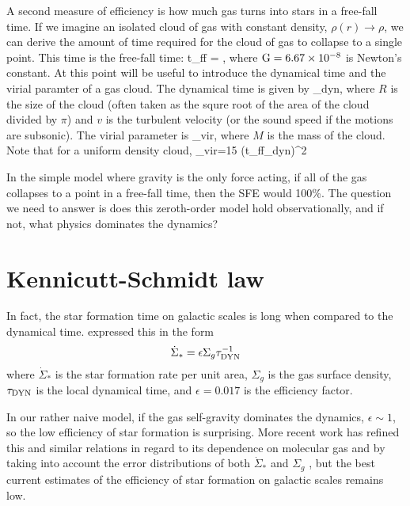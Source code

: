 \documentclass[../dissertation.tex]{subfiles}
\begin{document}
A second measure of efficiency is how much gas turns into stars in a free-fall time. If we imagine an isolated cloud of gas with constant density, $\rho(r) \rightarrow \rho$, we can derive the amount of time required for the cloud of gas to collapse to a single point.
This time is the free-fall time:
%
\be
t_{\rm ff} = ,
\ee
%
where $ {\rm G} = 6.67 \times 10^{-8} $ is Newton's constant. At this point will be useful to introduce the dynamical time and the virial paramter of a gas cloud. The dynamical time is given by
%
\be
\tau_{\rm dyn},
\ee
%
where $R$ is the size of the cloud (often taken as the squre root of the area of the cloud divided by $\pi$) and $v$ is the turbulent velocity (or the sound speed if the motions are subsonic). The virial parameter is
%
\be
\alpha_{\rm vir},
\ee
%
where $M$ is the mass of the cloud. Note that for a uniform density cloud,
%
\be
\alpha_{\rm vir}={15\pi} \left({t_{\rm ff}\over \tau_{\rm dyn}}\right)^2
\ee
%

In the simple model where gravity is the only force acting, if all of the gas collapses to a point in a free-fall time, then the SFE would 100\%.
The question we need to answer is does this zeroth-order model hold observationally, and if not, what physics dominates the dynamics?

\section{Kennicutt-Schmidt law}
In fact, the star formation time on galactic scales is long when compared to the dynamical time. 
\citet{1998ApJ...498..541K} expressed this in the form
%
\begin{equation}\label{eq:intro_KS_law}
\dot{\Sigma}_* = \epsilon\Sigma_g \tau_{\rm DYN}^{-1}
\end{equation}
%
where $\dot{\Sigma}_*$ is the star formation rate per unit area, $\Sigma_g$ is the 
gas surface density, $\tau_{\rm DYN}$ is the local dynamical time, and $\epsilon = 0.017$ 
is the efficiency factor.  

In our rather naive model, if the gas self-gravity dominates the dynamics, $\epsilon \sim 1$, so the low efficiency of star formation is surprising. 
More recent work has refined this and similar relations in regard to its dependence on molecular gas \citep{2008AJ....136.2846B} and by taking into account the error distributions of both $\dot\Sigma_*$ and $\Sigma_g$ \citep{2013MNRAS.430..288S}, but the best current estimates of the efficiency of star formation on galactic scales remains low. 
\end{document}
